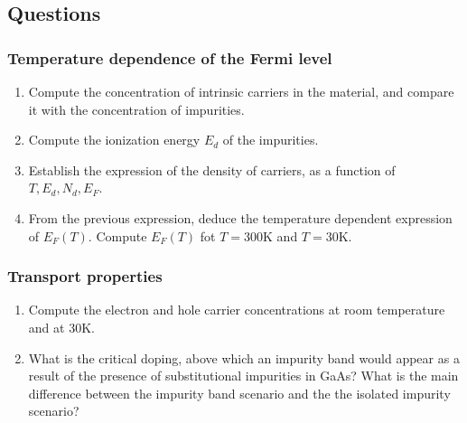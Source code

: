 \subsection*{Questions}

\subsubsection*{Temperature dependence of the Fermi level}

\begin{enumerate}[label=(\roman*)]
\item Compute the concentration of intrinsic carriers in the material,
  and compare it with the concentration of impurities.
\item Compute the ionization energy $E_d$ of the impurities.
\item Establish the expression of the density of carriers, as a
  function of $T, E_d, N_d, E_F$.
\item From the previous expression, deduce the temperature dependent
  expression of $E_F(T)$. Compute $E_F(T)$ fot $T=300$K and $T=30$K.
\end{enumerate}

\subsubsection*{Transport properties}

\begin{enumerate}[label=(\roman*)]
\item Compute the electron and hole carrier concentrations at room
  temperature and at $30$K.
\item What is the critical doping, above which an impurity band
  would appear as a result of the presence of substitutional
  impurities in GaAs? What is the main difference between the impurity
  band scenario and the the isolated impurity scenario?
\end{enumerate}




